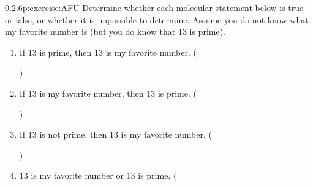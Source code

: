\documentclass[twoside,11pt,]{book}
\numberwithin{equation}{chapter}
\begin{document}
\begin{divisionsolution}{0.2.6}{}{p:exercise:AFU}%
Determine whether each molecular statement below is true or false, or whether it is impossible to determine. Assume you do not know what my favorite number is (but you do know that 13 is prime).%
\begin{enumerate}[label=(\alph*)]
\item{}If 13 is prime, then 13 is my favorite number. \quad()\quad
%
\item{}If 13 is my favorite number, then 13 is prime. \quad()\quad
%
\item{}If 13 is not prime, then 13 is my favorite number. \quad()\quad
%
\item{}13 is my favorite number or 13 is prime. \quad(
\end{enumerate}
\end{divisionsolution}
\end{document}
